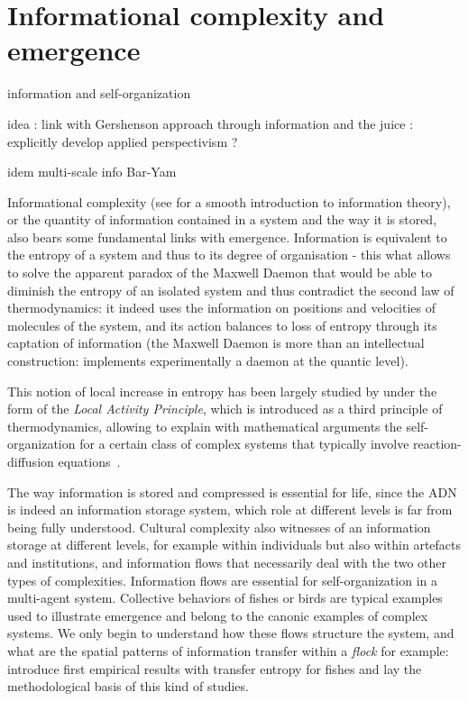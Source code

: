 \section{Informational complexity and emergence}


\cite{e18060197} information and self-organization

idea : link with Gershenson approach through information and the juice : explicitly develop applied perspectivism ?

idem multi-scale info Bar-Yam \cite{allen2017multiscale}


Informational complexity (see \cite{dedeo2016information} for a smooth introduction to information theory), or the quantity of information contained in a system and the way it is stored, also bears some fundamental links with emergence. Information is equivalent to the entropy of a system and thus to its degree of organisation - this what allows to solve the apparent paradox of the Maxwell Daemon that would be able to diminish the entropy of an isolated system and thus contradict the second law of thermodynamics: it indeed uses the information on positions and velocities of molecules of the system, and its action balances to loss of entropy through its captation of information (the Maxwell Daemon is more than an intellectual construction: \cite{cottet2017observing} implements experimentally a daemon at the quantic level).

This notion of local increase in entropy has been largely studied by  under the form of the \emph{Local Activity Principle}, which is introduced as a third principle of thermodynamics, allowing to explain with mathematical arguments the self-organization for a certain class of complex systems that typically involve reaction-diffusion equations~\cite{mainzer2013local}.


The way information is stored and compressed is essential for life, since the ADN is indeed an information storage system, which role at different levels is far from being fully understood. Cultural complexity also witnesses of an information storage at different levels, for example within individuals but also within artefacts and institutions, and information flows that necessarily deal with the two other types of complexities. Information flows are essential for self-organization in a multi-agent system. Collective behaviors of fishes or birds are typical examples used to illustrate emergence and belong to the canonic examples of complex systems. We only begin to understand how these flows structure the system, and what are the spatial patterns of information transfer within a \emph{flock} for example: \cite{crosato2017informative} introduce first empirical results with transfer entropy for fishes and lay the methodological basis of this kind of studies. 

